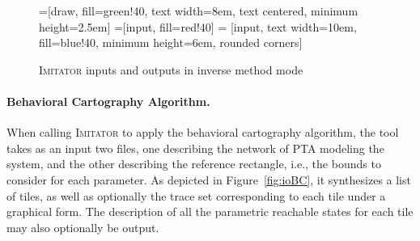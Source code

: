 \documentclass[a4paper,11pt]{article}
\newcommand{\A}{\mathcal{A}}
\newcommand{\imitator}{\textsc{Imitator}}
\newcommand{\paragraphe}[1]{\paragraph{#1.}}
\begin{document}
\begin{figure}[ht!]
=[draw, fill=green!40, text width=8em,
    text centered, minimum height=2.5em]
=[input, fill=red!40]
 = [input, text width=10em, fill=blue!40,
    minimum height=6em, rounded corners]
\def\blockdist{2.3}
\def\edgedist{2.5}

{

\centering


}

\caption{\imitator{} inputs and outputs in inverse method mode}
\label{fig:ioIM}
\end{figure}


\paragraphe{Behavioral Cartography Algorithm}
When calling \imitator{} to apply the behavioral cartography algorithm, the tool takes as an input two files, one describing the network of PTA modeling the system, and the other describing the reference rectangle, i.e., the bounds to consider for each parameter.
As depicted in Figure~\ref{fig:ioBC}, it synthesizes a list of tiles, as well as optionally the trace set corresponding to each tile under a graphical form.
The description of all the parametric reachable states for each tile may also optionally be output.
\end{document}
